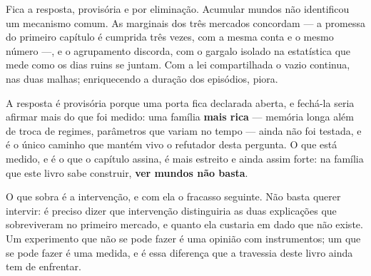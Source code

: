 Fica a resposta, provisória e por eliminação. Acumular mundos não identificou um mecanismo
comum. As marginais dos três mercados concordam --- a promessa do primeiro capítulo é cumprida
três vezes, com a mesma conta e o mesmo número ---, e o agrupamento discorda, com o gargalo
isolado na estatística que mede como os dias ruins se juntam. Com a lei compartilhada o vazio
continua, nas duas malhas; enriquecendo a duração dos episódios, piora.

A resposta é provisória porque uma porta fica declarada aberta, e fechá-la seria afirmar mais do
que foi medido: uma família \textbf{mais rica} --- memória longa além de troca de regimes, parâmetros
que variam no tempo \cite{palma2010efficient} --- ainda não foi testada, e é o único caminho que mantém vivo o refutador
desta pergunta. O que está medido, e é o que o capítulo assina, é mais estreito e ainda assim
forte: na família que este livro sabe construir, \textbf{ver mundos não basta}.

O que sobra é a intervenção, e com ela o fracasso seguinte. Não basta querer intervir: é preciso
dizer que intervenção distinguiria as duas explicações que sobreviveram no primeiro mercado, e
quanto ela custaria em dado que não existe. Um experimento que não se pode fazer é uma opinião com
instrumentos; um que se pode fazer é uma medida, e é essa diferença que a travessia deste livro
ainda tem de enfrentar.
